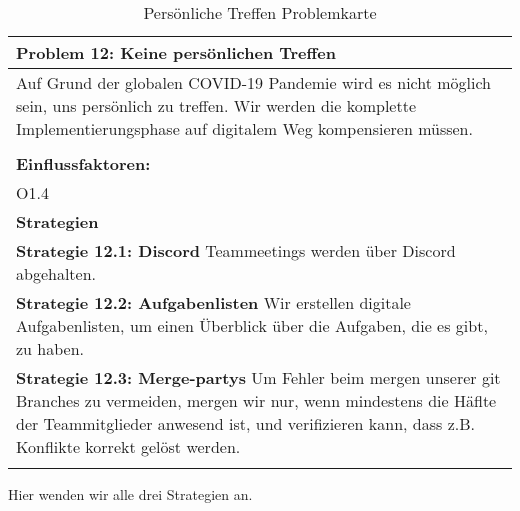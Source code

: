 \documentclass[fontsize=12pt,paper=a4,twoside]{scrartcl}
\begin{document}
\begin{table}[H]
    \centering
    \begin{tabular}{|p{15cm}|}
    \hline
          \textbf{Problem 12: Keine persönlichen Treffen}  \\ \hline
	Auf Grund der globalen COVID-19 Pandemie wird es nicht möglich sein, uns persönlich zu treffen. Wir werden die komplette Implementierungsphase auf digitalem Weg kompensieren müssen. \\
         \\ \hline
          \textbf{Einflussfaktoren: } \\
	O1.4 \\
          \hline
          \textbf{Strategien} \\ \hline
            {}          
           \label{strategie:12.1}     
          \textbf{Strategie 12.1: Discord} Teammeetings werden über Discord abgehalten.  \\        
  {}          
           \label{strategie:12.2}              
          \textbf{Strategie 12.2: Aufgabenlisten} Wir erstellen digitale Aufgabenlisten, um einen Überblick über die Aufgaben, die es gibt, zu haben.  \\
	 {}          
           \label{strategie:12.3}     
          \textbf{Strategie 12.3: Merge-partys} Um Fehler beim mergen unserer git Branches zu vermeiden, mergen wir nur, wenn mindestens die Häflte der Teammitglieder anwesend ist, und verifizieren kann, dass z.B. Konflikte korrekt gelöst werden. \\ 
	 \\ \hline
    \end{tabular}

    \caption{Persönliche Treffen Problemkarte}
    \label{tab:ProblemKarte12}
\end{table}
Hier wenden wir alle drei Strategien an. \\
\end{document}
